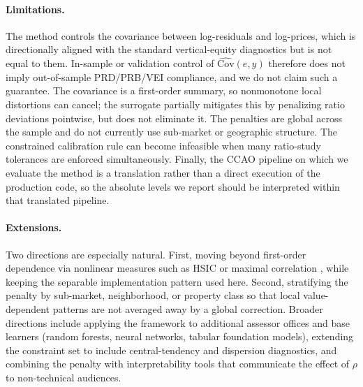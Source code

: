 \documentclass[12pt]{article}
\theoremstyle{plain}
\theoremstyle{definition}
\newcommand{\1}{\mathbf{1}}
\newcommand{\Cov}{\text{Cov}}
\begin{document}
\paragraph{Limitations.}
The method controls the covariance between log-residuals and log-prices, which is directionally aligned with the standard vertical-equity diagnostics but is not equal to them. In-sample or validation control of $\widehat{\Cov}(e,y)$ therefore does not imply out-of-sample PRD/PRB/VEI compliance, and we do not claim such a guarantee. The covariance is a first-order summary, so nonmonotone local distortions can cancel; the surrogate partially mitigates this by penalizing ratio deviations pointwise, but does not eliminate it. The penalties are global across the sample and do not currently use sub-market or geographic structure. The constrained calibration rule can become infeasible when many ratio-study tolerances are enforced simultaneously. Finally, the CCAO pipeline on which we evaluate the method is a translation rather than a direct execution of the production code, so the absolute levels we report should be interpreted within that translated pipeline.

\paragraph{Extensions.}
Two directions are especially natural. First, moving beyond first-order dependence via nonlinear measures such as HSIC or maximal correlation \cite{LiEtAl2022Fairness,lee2022maximal}, while keeping the separable implementation pattern used here. Second, stratifying the penalty by sub-market, neighborhood, or property class so that local value-dependent patterns are not averaged away by a global correction. Broader directions include applying the framework to additional assessor offices and base learners (random forests, neural networks, tabular foundation models), extending the constraint set to include central-tendency and dispersion diagnostics, and combining the penalty with interpretability tools that communicate the effect of $\rho$ to non-technical audiences.

\end{document}
